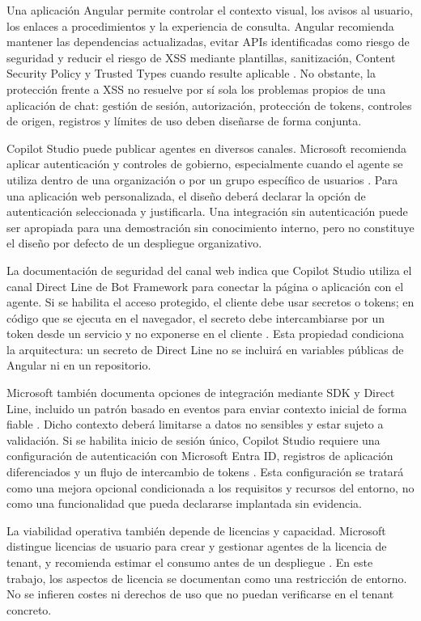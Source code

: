 \documentclass[12pt,twoside,titlepage]{book}
\begin{document}
Una aplicación Angular permite controlar el contexto visual, los avisos al
usuario, los enlaces a procedimientos y la experiencia de consulta. Angular
recomienda mantener las dependencias actualizadas, evitar APIs identificadas como
riesgo de seguridad y reducir el riesgo de XSS mediante plantillas, sanitización,
Content Security Policy y Trusted Types cuando resulte aplicable
\cite{angularSecurity}. No obstante, la protección frente a XSS no resuelve por
sí sola los problemas propios de una aplicación de chat: gestión de sesión,
autorización, protección de tokens, controles de origen, registros y límites de
uso deben diseñarse de forma conjunta.

Copilot Studio puede publicar agentes en diversos canales. Microsoft recomienda
aplicar autenticación y controles de gobierno, especialmente cuando el agente se
utiliza dentro de una organización o por un grupo específico de usuarios
\cite{copilotPublish}. Para una aplicación web personalizada, el diseño deberá
declarar la opción de autenticación seleccionada y justificarla. Una integración
sin autenticación puede ser apropiada para una demostración sin conocimiento
interno, pero no constituye el diseño por defecto de un despliegue organizativo.

La documentación de seguridad del canal web indica que Copilot Studio utiliza el
canal Direct Line de Bot Framework para conectar la página o aplicación con el
agente. Si se habilita el acceso protegido, el cliente debe usar secretos o
tokens; en código que se ejecuta en el navegador, el secreto debe intercambiarse
por un token desde un servicio y no exponerse en el cliente
\cite{copilotWebSecurity}. Esta propiedad condiciona la arquitectura: un secreto
de Direct Line no se incluirá en variables públicas de Angular ni en un
repositorio.

Microsoft también documenta opciones de integración mediante SDK y Direct Line,
incluido un patrón basado en eventos para enviar contexto inicial de forma fiable
\cite{copilotDirectLine}. Dicho contexto deberá limitarse a datos no sensibles y
estar sujeto a validación. Si se habilita inicio de sesión único, Copilot Studio
requiere una configuración de autenticación con Microsoft Entra ID, registros de
aplicación diferenciados y un flujo de intercambio de tokens
\cite{copilotSso}. Esta configuración se tratará como una mejora opcional
condicionada a los requisitos y recursos del entorno, no como una funcionalidad
que pueda declararse implantada sin evidencia.

La viabilidad operativa también depende de licencias y capacidad. Microsoft
distingue licencias de usuario para crear y gestionar agentes de la licencia de
tenant, y recomienda estimar el consumo antes de un despliegue
\cite{copilotLicensing}. En este trabajo, los aspectos de licencia se documentan
como una restricción de entorno. No se infieren costes ni derechos de uso que no
puedan verificarse en el tenant concreto.
\end{document}

